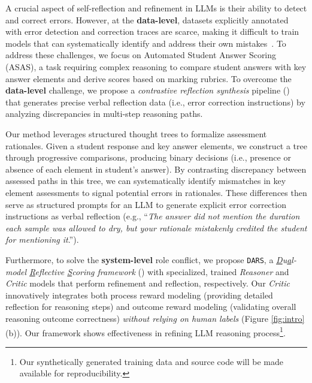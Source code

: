 A crucial aspect of self-reflection and refinement in LLMs is their ability to detect and correct errors. However, at the \textbf{data-level}, datasets explicitly annotated with error detection and correction traces are scarce, making it difficult to train models that can systematically identify and address their own mistakes~\cite{liu2024best}. To address these challenges, we focus on Automated Student Answer Scoring (ASAS), a task requiring complex reasoning to compare student answers with key answer elements and derive scores based on marking rubrics. To overcome the \textbf{data-level} challenge, we propose a \emph{contrastive reflection synthesis} pipeline (\textsection{\ref{sec:method_data_curation}}) that generates precise verbal reflection data (i.e., error correction instructions) by analyzing discrepancies in multi-step reasoning paths.

Our method leverages structured thought trees to formalize assessment rationales. Given a student response and key answer elements, we construct a tree through progressive comparisons, producing binary decisions (i.e., presence or absence of each element in student's answer). By contrasting discrepancy between assessed paths in this tree, we can systematically identify mismatches in key element assessments to signal potential errors in rationales. These differences then serve as structured prompts for an LLM to generate explicit error correction instructions as verbal reflection (e.g., ``\emph{The answer did not mention the duration each sample was allowed to dry, but your rationale mistakenly credited the student for mentioning it}.'').

Furthermore, to solve the \textbf{system-level} role conflict, we %
propose \texttt{DARS}, a \emph{\underline{D}u\underline{a}l-model \underline{R}eflective \underline{S}coring framework} (\textsection{\ref{sec:reasoning_framework}}) with specialized, trained \textit{Reasoner} and \textit{Critic} models that perform refinement and reflection, respectively. Our \textit{Critic} innovatively integrates both process reward modeling (providing detailed reflection for reasoning steps) and outcome reward modeling (validating overall reasoning outcome correctness) \emph{without relying on human labels} (Figure \ref{fig:intro} (b)). %
Our framework shows effectiveness in refining LLM reasoning process\footnote{Our synthetically generated training data and source code will be made available for reproducibility.}.%

